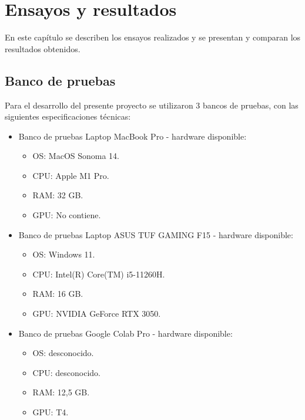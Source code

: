 
\chapter{Ensayos y resultados} %

\label{Chapter4} %

En este capítulo se describen los ensayos realizados y se presentan y comparan los resultados obtenidos.

\section{Banco de pruebas}
\label{sec:pruebasHW}

Para el desarrollo del presente proyecto se utilizaron 3 bancos de pruebas, con las siguientes especificaciones técnicas:

\begin{itemize}
\item Banco de pruebas Laptop MacBook Pro - hardware disponible:
	\begin{itemize}
	\item OS: MacOS Sonoma 14.
	\item CPU: Apple M1 Pro.
	\item RAM: 32 GB.
	\item GPU: No contiene.
	\end{itemize}
\item Banco de pruebas Laptop ASUS TUF GAMING F15 - hardware disponible:
	\begin{itemize}
	\item OS: Windows 11.
	\item CPU: Intel(R) Core(TM) i5-11260H.
	\item RAM: 16 GB.
	\item GPU: NVIDIA GeForce RTX 3050.
	\end{itemize}
\item Banco de pruebas Google Colab Pro - hardware disponible:
	\begin{itemize}
	\item OS: desconocido.
	\item CPU: desconocido.
	\item RAM: 12,5 GB.
	\item GPU: T4.
	\end{itemize}
\end{itemize}


